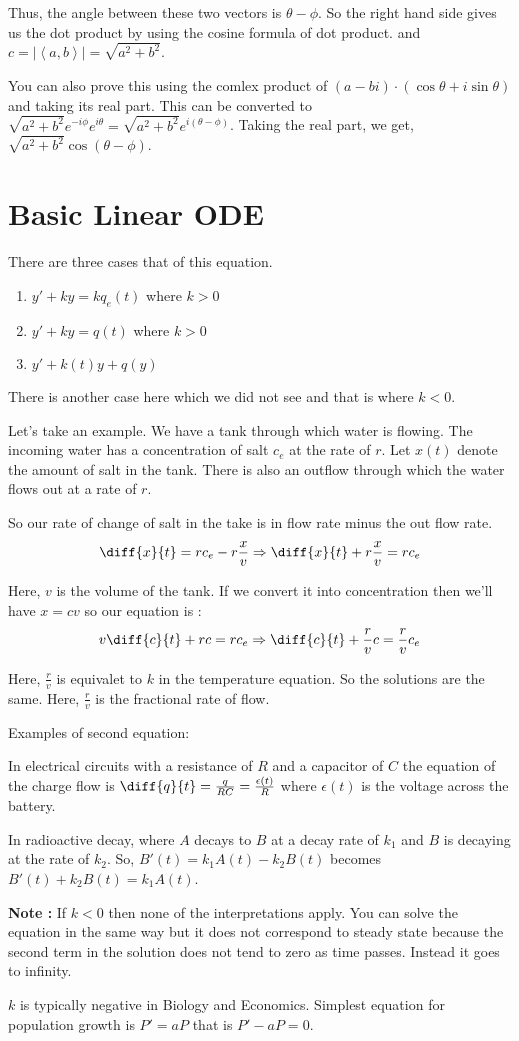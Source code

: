 Thus, the angle between these two vectors is $\theta - \phi$. So the right hand side gives us the dot product by using the cosine formula of dot product.
and $c = |\left< a, b \right>| = \sqrt{a^2 + b^2}$.

You can also prove this using the comlex product of $(a-bi)\cdot(\cos \theta + i \sin \theta)$ and taking its real part.
This can be converted to $\sqrt{a^2+b^2} e^{-i\phi} e^{i\theta} = \sqrt{a^2 + b^2} e^{i(\theta - \phi)}$.
Taking the real part, we get, $\sqrt{a^2 + b^2} \cos (\theta - \phi)$.

\pagebreak

\section{Basic Linear ODE}

There are three cases that of this equation.

\begin{enumerate}
	\item $y' + ky = kq_e(t)$ where $k > 0$
	\item $y' + ky = q(t)$ where $k > 0$
	\item $y' + k(t)y + q(y)$
\end{enumerate}

There is another case here which we did not see and that is where $k < 0$.

Let's take an example. We have a tank through which water is flowing.
The incoming water has a concentration of salt $c_e$ at the rate of $r$.
Let $x(t)$ denote the amount of salt in the tank.
There is also an outflow through which the water flows out at a rate of $r$.

So our rate of change of salt in the take is in flow rate minus the out flow rate.
$$ \diff{x}{t} = rc_e - r\frac{x}{v} \Rightarrow \diff{x}{t} + r\frac{x}{v} = rc_e $$

Here, $v$ is the volume of the tank. 
If we convert it into concentration then we'll have $x = cv$ so our equation is :
$$ v \diff{c}{t} + rc = rc_e \Rightarrow \diff{c}{t} + \frac{r}{v} c = \frac{r}{v} c_e $$ 

Here, $\frac{r}{v}$ is equivalet to $k$ in the temperature equation. 
So the solutions are the same. Here, $\frac{r}{v}$ is the fractional rate of flow.

Examples of second equation:

In electrical circuits with a resistance of $R$ and a capacitor of $C$ the equation of the charge flow is $\diff{q}{t} = \frac{q}{RC} = \frac{\epsilon(t)}{R}$ where $\epsilon(t)$ is the voltage across the battery.

In radioactive decay, where $A$ decays to $B$ at a decay rate of $k_1$ and $B$ is decaying at the rate of $k_2$.
So, $B'(t) = k_1A(t) - k_2B(t)$ becomes $B'(t) + k_2B(t) = k_1A(t)$.

{\bf Note : } If $k < 0$ then none of the interpretations apply.
You can solve the equation in the same way but it does not correspond to steady state
because the second term in the solution does not tend to zero as time passes. Instead it goes to infinity.

$k$ is typically negative in Biology and Economics.
Simplest equation for population growth is $P' = aP$ that is $P' - aP = 0$.